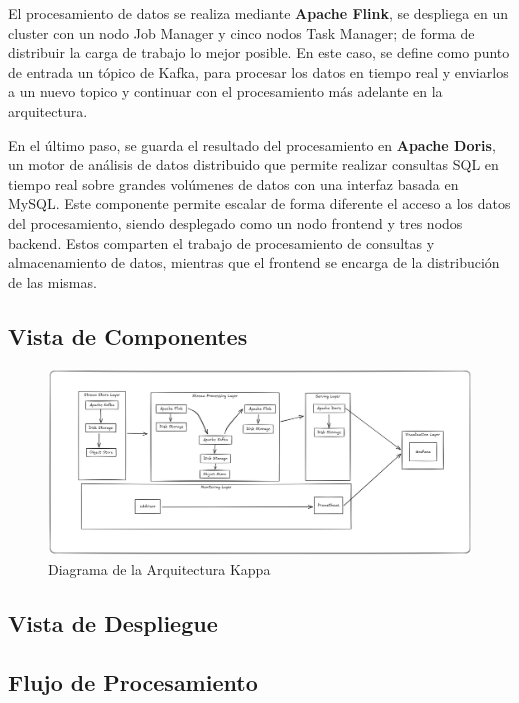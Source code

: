 El procesamiento de datos se realiza mediante \textbf{Apache Flink},
se despliega en un cluster con un nodo Job Manager y cinco nodos Task Manager; de forma de distribuir la carga de trabajo lo mejor posible.
En este caso, se define como punto de entrada un tópico de Kafka, para procesar los datos en tiempo real y
enviarlos a un nuevo topico y continuar con el procesamiento más adelante en la arquitectura.

En el último paso, se guarda el resultado del procesamiento en \textbf{Apache Doris}, un motor de análisis de datos
distribuido que permite realizar consultas SQL en tiempo real sobre grandes volúmenes de datos con una interfaz basada en MySQL.
Este componente permite escalar de forma diferente el acceso a los datos del procesamiento, 
siendo desplegado como un nodo frontend y tres nodos backend. 
Estos comparten el trabajo de procesamiento de consultas y almacenamiento de datos, 
mientras que el frontend se encarga de la distribución de las mismas. 
\subsection{Vista de Componentes}

\begin{figure}[h]
\centering
\includegraphics[width=1\textwidth]{desarrollo/Kappa.png}
\caption{Diagrama de la Arquitectura Kappa}
\label{fig:des_arquitectura_kappa}
\end{figure}

\subsection{Vista de Despliegue}

\subsection{Flujo de Procesamiento}
